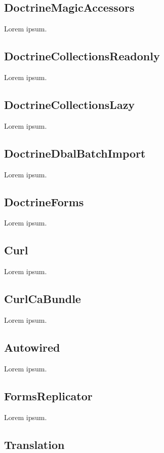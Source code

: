 \subsection{DoctrineMagicAccessors}

Lorem ipsum.

\subsection{DoctrineCollectionsReadonly}

Lorem ipsum.

\subsection{DoctrineCollectionsLazy}

Lorem ipsum.

\subsection{DoctrineDbalBatchImport}

Lorem ipsum.

\subsection{DoctrineForms}

Lorem ipsum.

\subsection{Curl}

Lorem ipsum.

\subsection{CurlCaBundle}

Lorem ipsum.

\subsection{Autowired}

Lorem ipsum.

\subsection{FormsReplicator}

Lorem ipsum.

\subsection{Translation}

